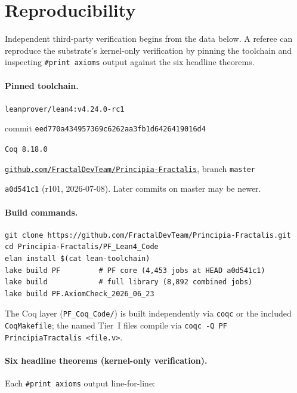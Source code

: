 \documentclass[11pt,a4paper]{amsart}
\theoremstyle{plain}
\theoremstyle{definition}
\begin{document}
\section{Reproducibility}\label{sec:reproducibility}

Independent third-party verification begins from the data below. A referee can reproduce the substrate's kernel-only verification by pinning the toolchain and inspecting \texttt{\#print axioms} output against the six headline theorems.

\paragraph{Pinned toolchain.}
\begin{description}[font=\normalfont\bfseries,leftmargin=2em,itemsep=2pt]
\item[Lean toolchain] \texttt{leanprover/lean4:v4.24.0-rc1}
\item[mathlib revision] commit \texttt{eed770a434957369c6262aa3fb1d6426419016d4}
\item[Coq version] \texttt{Coq 8.18.0}
\item[Repository] \href{https://github.com/FractalDevTeam/Principia-Fractalis}{\texttt{github.com/FractalDevTeam/Principia-Fractalis}}, branch \texttt{master}
\item[HEAD reference] \texttt{a0d541c1} (r101, 2026-07-08). Later commits on master may be newer.
\end{description}

\paragraph{Build commands.}
\begin{verbatim}
git clone https://github.com/FractalDevTeam/Principia-Fractalis.git
cd Principia-Fractalis/PF_Lean4_Code
elan install $(cat lean-toolchain)
lake build PF         # PF core (4,453 jobs at HEAD a0d541c1)
lake build            # full library (8,892 combined jobs)
lake build PF.AxiomCheck_2026_06_23
\end{verbatim}
The Coq layer (\texttt{PF\_Coq\_Code/}) is built independently via \texttt{coqc} or the included \texttt{CoqMakefile}; the named Tier~I files compile via \texttt{coqc -Q PF PrincipiaTractalis <file.v>}.

\paragraph{Six headline theorems (kernel-only verification).} Each \texttt{\#print axioms} output line-for-line:
\end{document}
